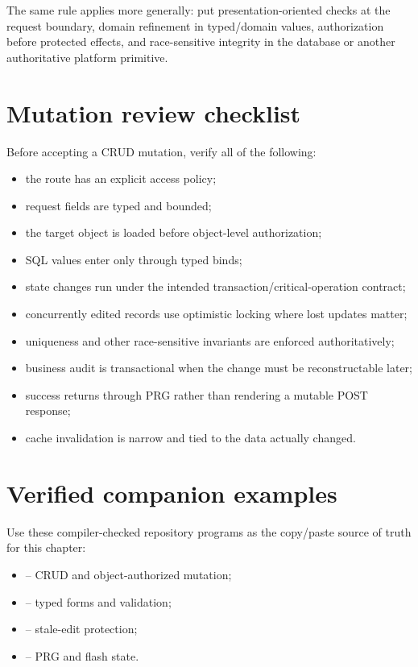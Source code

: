 The same rule applies more generally: put presentation-oriented checks at the request boundary, domain refinement in typed/domain values, authorization before protected effects, and race-sensitive integrity in the database or another authoritative platform primitive.

\section{Mutation review checklist}

Before accepting a CRUD mutation, verify all of the following:

\begin{itemize}
  \item the route has an explicit access policy;
  \item request fields are typed and bounded;
  \item the target object is loaded before object-level authorization;
  \item SQL values enter only through typed binds;
  \item state changes run under the intended transaction/critical-operation contract;
  \item concurrently edited records use optimistic locking where lost updates matter;
  \item uniqueness and other race-sensitive invariants are enforced authoritatively;
  \item business audit is transactional when the change must be reconstructable later;
  \item success returns through PRG rather than rendering a mutable POST response;
  \item cache invalidation is narrow and tied to the data actually changed.
\end{itemize}

\section{Verified companion examples}
Use these compiler-checked repository programs as the copy/paste source of truth for this chapter:
\begin{itemize}
  \item {} -- CRUD and object-authorized mutation;
  \item {} -- typed forms and validation;
  \item {} -- stale-edit protection;
  \item {} -- PRG and flash state.
\end{itemize}

